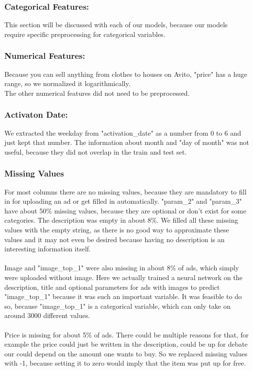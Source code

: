 \documentclass[runningheads]{llncs}
\begin{document}
\subsubsection{Categorical Features:} This section will be discussed with each of our models, because our models require specific preprocessing for categorical variables.
\subsubsection{Numerical Features:}
Because you can sell anything from clothes to houses on Avito, "price" has a huge range, so we normalized it logarithmically.\\
The other numerical features did not need to be preprocessed.
\subsubsection{Activaton Date:} 
We extracted the weekday from "activation\_date" as a number from 0 to 6 and just kept that number. The information about month and "day of month" was not useful, because they did not overlap in the train and test set.

\subsubsection{Missing Values}
 For most columns there are no missing values, because they are mandatory to fill in for uploading an ad or get filled in automatically. "param\_2" and "param\_3" have about 50\% missing values, because they are optional or don't exist for some categories. The description was empty in about 8\%. We filled all these missing values with the empty string, as there is no good way to approximate these values and it may not even be desired because having no description is an interesting information itself.\\ \\
 Image and "image\_top\_1" were also missing in about 8\% of ads, which simply were uploaded without image. Here we actually trained a neural network on the description, title and optional parameters for ads with images to predict "image\_top\_1" because it was such an important variable. It was feasible to do so, because "image\_top\_1" is a categorical variable, which can only take on around 3000 different values.\\ \\
 Price is missing for about 5\%  of ads. There could be multiple reasons for that, for example the price could just be written in the description, could be up for debate our could depend on the amount one wants to buy. So we replaced missing values with -1, because setting it to zero would imply that the item was put up for free.
 
\end{document}
